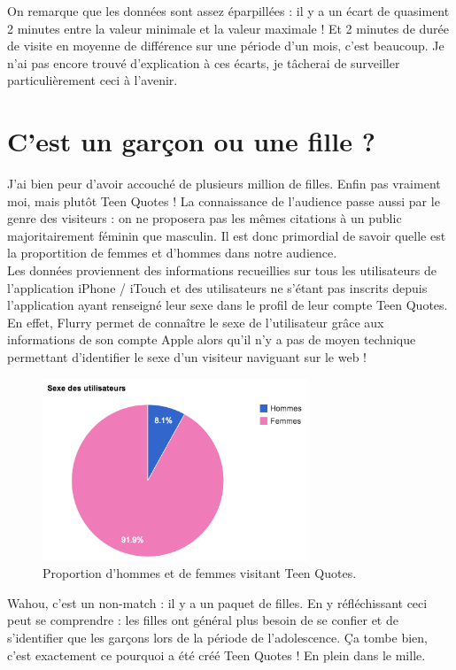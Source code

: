 \documentclass{report}
\begin{document}
	On remarque que les données sont assez éparpillées : il y a un écart de quasiment 2 minutes entre la valeur minimale et la valeur maximale ! Et 2 minutes de durée de visite en moyenne de différence sur une période d'un mois, c'est beaucoup. Je n'ai pas encore trouvé d'explication à ces écarts, je tâcherai de surveiller particulièrement ceci à l'avenir.

	\section{C'est un garçon ou une fille ?}
	J'ai bien peur d'avoir accouché de plusieurs million de filles. Enfin pas vraiment moi, mais plutôt Teen Quotes ! La connaissance de l'audience passe aussi par le genre des visiteurs : on ne proposera pas les mêmes citations à un public majoritairement féminin que masculin. Il est donc primordial de savoir quelle est la proportition de femmes et d'hommes dans notre audience.\\

	Les données proviennent des informations recueillies sur tous les utilisateurs de l'application iPhone / iTouch et des utilisateurs ne s'étant pas inscrits depuis l'application ayant renseigné leur sexe dans le profil de leur compte Teen Quotes. En effet, Flurry permet de connaître le sexe de l'utilisateur grâce aux informations de son compte Apple alors qu'il n'y a pas de moyen technique permettant d'identifier le sexe d'un visiteur naviguant sur le web !
	\begin{figure}[H]
		\center
		\includegraphics[width=300px]{images/sexeUtilisateurs.png}
		\caption{Proportion d'hommes et de femmes visitant Teen Quotes.}
	\end{figure}
	Wahou, c'est un non-match : il y a un paquet de filles. En y réfléchissant ceci peut se comprendre : les filles ont général plus besoin de se confier et de s'identifier que les garçons lors de la période de l'adolescence. Ça tombe bien, c'est exactement ce pourquoi a été créé Teen Quotes ! En plein dans le mille.
\end{document}
